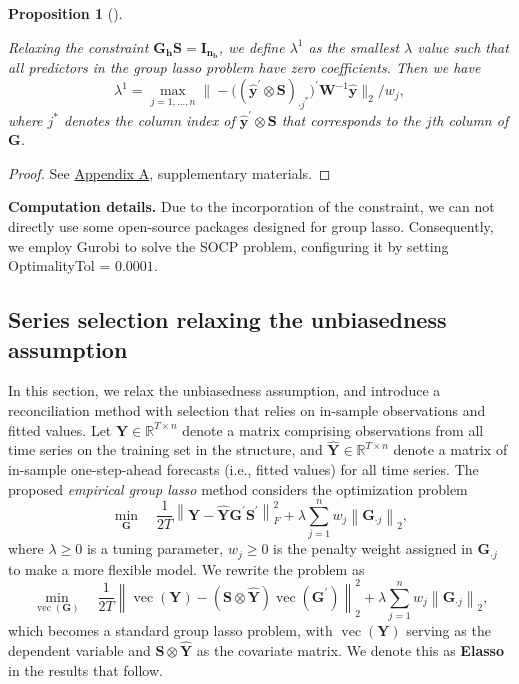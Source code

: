 \documentclass[
  11pt]{article}
\theoremstyle{plain}
\newtheorem{proposition}{Proposition}[section]
\theoremstyle{remark}
\begin{document}
\begin{proposition}[]\protect\hypertarget{prp-3}{}\label{prp-3}

Relaxing the constraint \(\bm{G_h S}=\bm{I_{n_b}}\), we define
\(\lambda^{1}\) as the smallest \(\lambda\) value such that all
predictors in the group lasso problem have zero coefficients. Then we
have \[
\lambda^{1} = \max_{j=1, \ldots, n}\big\|-\big((\hat{\bm{y}}^{\prime} \otimes \bm{S})_{\cdot j^{*}}\big)^{\prime} \bm{W}^{-1} \hat{\bm{y}}\big\|_2 / w_j,
\] where \(j^{*}\) denotes the column index of
\(\hat{\bm{y}}^{\prime} \otimes \bm{S}\) that corresponds to the \(j\)th
column of \(\bm{G}\).

\end{proposition}

\begin{proof}
See \hyperref[appendix-proofs]{Appendix A}, supplementary materials.
\end{proof}

\textbf{Computation details.} Due to the incorporation of the
constraint, we can not directly use some open-source packages designed
for group lasso. Consequently, we employ Gurobi to solve the SOCP
problem, configuring it by setting OptimalityTol = \(0.0001\).

\subsection{Series selection relaxing the unbiasedness
assumption}\label{sec-unconstrained}

In this section, we relax the unbiasedness assumption, and introduce a
reconciliation method with selection that relies on in-sample
observations and fitted values. Let
\(\bm{Y} \in \mathbb{R}^{T \times n}\) denote a matrix comprising
observations from all time series on the training set in the structure,
and \(\hat{\bm{Y}} \in \mathbb{R}^{T \times n}\) denote a matrix of
in-sample one-step-ahead forecasts (i.e., fitted values) for all time
series. The proposed \emph{empirical group lasso} method considers the
optimization problem \[
\min_{\bm{G}} \quad \frac{1}{2 T} \left\|\bm{Y}-\hat{\bm{Y}} \bm{G}^{\prime} \bm{S}^{\prime}\right\|_F^2 + \lambda \sum_{j=1}^n w_j \left\|\bm{G}_{\cdot j}\right\|_2,
\] where \(\lambda \geq 0\) is a tuning parameter, \(w_j \geq 0\) is the
penalty weight assigned in \(\bm{G}_{\cdot j}\) to make a more flexible
model. We rewrite the problem as \[
\min_{\operatorname{vec}(\bm{G})} \quad \frac{1}{2 T} \left\|\operatorname{vec}(\bm{Y})-(\bm{S} \otimes \hat{\bm{Y}}) \operatorname{vec}\left(\bm{G}^{\prime}\right)\right\|_2^2 + \lambda \sum_{j=1}^n w_j \left\|\bm{G}_{\cdot j}\right\|_2,
\] which becomes a standard group lasso problem, with
\(\operatorname{vec}(\bm{Y})\) serving as the dependent variable and
\(\bm{S} \otimes \hat{\bm{Y}}\) as the covariate matrix. We denote this
as \textbf{Elasso} in the results that follow.
\end{document}

